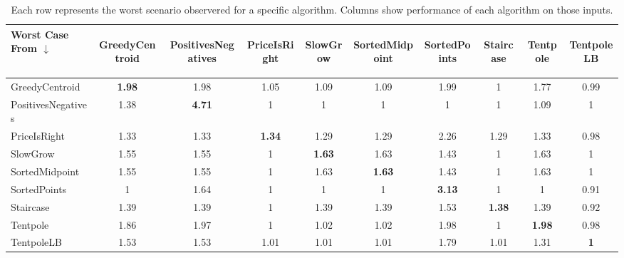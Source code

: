 \begin{table*} \centering
\begin{tabular}{|l|cccccccc|c|}
\hline
Worst Case From $\downarrow$
 & \begin{sideways} GreedyCentroid \end{sideways}
 & \begin{sideways} PositivesNegatives \end{sideways}
 & \begin{sideways} PriceIsRight \end{sideways}
 & \begin{sideways} SlowGrow \end{sideways}
 & \begin{sideways} SortedMidpoint \end{sideways}
 & \begin{sideways} SortedPoints \end{sideways}
 & \begin{sideways} Staircase \end{sideways}
 & \begin{sideways} Tentpole \end{sideways}
 & \begin{sideways} TentpoleLB \end{sideways}
 \\ \hline
GreedyCentroid & \textbf{1.98} & 1.98 & 1.05 & 1.09 & 1.09 & 1.99 & 1 & 1.77 & 0.99\\ 
PositivesNegatives & 1.38 & \textbf{4.71} & 1 & 1 & 1 & 1 & 1 & 1.09 & 1\\ 
PriceIsRight & 1.33 & 1.33 & \textbf{1.34} & 1.29 & 1.29 & 2.26 & 1.29 & 1.33 & 0.98\\ 
SlowGrow & 1.55 & 1.55 & 1 & \textbf{1.63} & 1.63 & 1.43 & 1 & 1.63 & 1\\ 
SortedMidpoint & 1.55 & 1.55 & 1 & 1.63 & \textbf{1.63} & 1.43 & 1 & 1.63 & 1\\ 
SortedPoints & 1 & 1.64 & 1 & 1 & 1 & \textbf{3.13} & 1 & 1 & 0.91 \\ 
Staircase & 1.39 & 1.39 & 1 & 1.39 & 1.39 & 1.53 & \textbf{1.38} & 1.39 & 0.92\\ 
Tentpole & 1.86 & 1.97 & 1 & 1.02 & 1.02 & 1.98 & 1 &  \textbf{1.98} &0.98\\ 
TentpoleLB & 1.53 & 1.53 & 1.01 & 1.01 & 1.01 & 1.79 & 1.01 & 1.31 & \textbf{1}\\ 
\hline 
 \end{tabular}
  \caption{Each row represents the worst scenario observered for a specific algorithm.  Columns show performance of each algorithm on those inputs.}
  \label{table:worstCases}
\end{table*}

